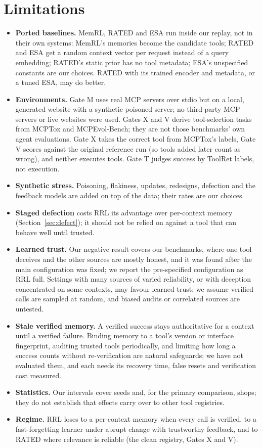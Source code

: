 \documentclass[11pt]{article}
\begin{document}
\section{Limitations}
\label{sec:limits}

\begin{itemize}
  \item \textbf{Ported baselines.} MemRL, RATED and ESA run inside our replay, not in their own
  systems: MemRL's memories become the candidate tools; RATED and ESA get a random context vector
  per request instead of a query embedding; RATED's static prior has no tool metadata; ESA's
  unspecified constants are our choices. RATED with its trained encoder and metadata, or a tuned
  ESA, may do better.
  \item \textbf{Environments.} Gate M uses real MCP servers over stdio but on a local, generated
  website with a synthetic poisoned server; no third-party MCP servers or live websites were used.
  Gates X and V derive tool-selection tasks from MCPTox and MCPEvol-Bench; they are not those
  benchmarks' own agent evaluations. Gate X takes the correct tool from MCPTox's labels, Gate V
  scores against the original reference run (so tools added later count as wrong), and neither
  executes tools. Gate T judges success by ToolRet labels, not execution.
  \item \textbf{Synthetic stress.} Poisoning, flakiness, updates, redesigns, defection and the
  feedback models are added on top of the data; their rates are our choices.
  \item \textbf{Staged defection} costs RRL its advantage over per-context memory
  (Section~\ref{sec:defect}); it should not be relied on against a tool that can behave well
  until trusted.
  \item \textbf{Learned trust.} Our negative result covers our benchmarks, where one tool
  deceives and the other sources are mostly honest, and it was found after the main
  configuration was fixed; we report the pre-specified configuration as RRL full. Settings with many sources of varied
  reliability, or with deception concentrated on some contexts, may favour learned trust; we
  assume verified calls are sampled at random, and biased audits or correlated sources are
  untested.
  \item \textbf{Stale verified memory.} A verified success stays authoritative for a context
  until a verified failure. Binding memory to a tool's version or interface fingerprint,
  auditing trusted tools periodically, and limiting how long a success counts without
  re-verification are natural safeguards; we have not evaluated them, and each needs its
  recovery time, false resets and verification cost measured.
  \item \textbf{Statistics.} Our intervals cover seeds and, for the primary comparison, shops;
  they do not establish that effects carry over to other tool registries.
  \item \textbf{Regime.} RRL loses to a per-context memory when every call is verified, to a
  fast-forgetting learner under abrupt change with trustworthy feedback, and to RATED where
  relevance is reliable (the clean registry, Gates X and V).
\end{itemize}
\end{document}
